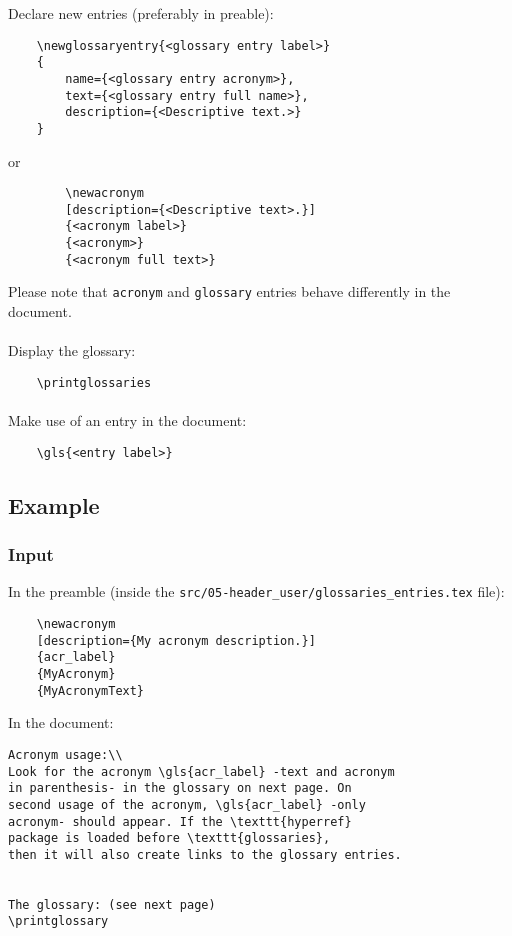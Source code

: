    Declare new entries (preferably in preable):
    \begin{lstlisting}
    \newglossaryentry{<glossary entry label>}
    {
        name={<glossary entry acronym>},
        text={<glossary entry full name>},
        description={<Descriptive text.>}
    }
    \end{lstlisting}

    or
    \begin{lstlisting}
        \newacronym
        [description={<Descriptive text>.}]
        {<acronym label>}
        {<acronym>}
        {<acronym full text>}
    \end{lstlisting}

    Please note that \texttt{acronym} and \texttt{glossary} entries behave
    differently in the document.



    \paragraph{}Display the glossary:
    \begin{lstlisting}
    \printglossaries
    \end{lstlisting}

    \paragraph{}Make use of an entry in the document:
    \begin{lstlisting}
    \gls{<entry label>}
    \end{lstlisting}


\subsection{Example}
\subsubsection{Input}
In the preamble (inside the \verb|src/05-header_user/glossaries_entries.tex|
file):
\begin{lstlisting}
    \newacronym
    [description={My acronym description.}]
    {acr_label}
    {MyAcronym}
    {MyAcronymText}
\end{lstlisting}


In the document:
\begin{lstlisting}
Acronym usage:\\
Look for the acronym \gls{acr_label} -text and acronym
in parenthesis- in the glossary on next page. On
second usage of the acronym, \gls{acr_label} -only
acronym- should appear. If the \texttt{hyperref}
package is loaded before \texttt{glossaries},
then it will also create links to the glossary entries.


The glossary: (see next page)
\printglossary
\end{lstlisting}


